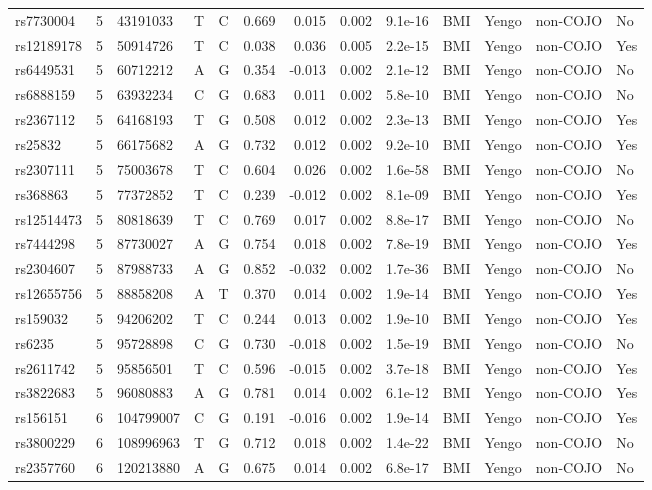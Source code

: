 \documentclass[11pt,twoside]{bristolthesis}
\begin{document}
\begin{longtable}[t]{lrlllrrrlllll}
rs7730004 & 5 & 43191033 & T & C & 0.669 & 0.015 & 0.002 & 9.1e-16 & BMI & Yengo & non-COJO & No\\
rs12189178 & 5 & 50914726 & T & C & 0.038 & 0.036 & 0.005 & 2.2e-15 & BMI & Yengo & non-COJO & Yes\\
rs6449531 & 5 & 60712212 & A & G & 0.354 & -0.013 & 0.002 & 2.1e-12 & BMI & Yengo & non-COJO & No\\
rs6888159 & 5 & 63932234 & C & G & 0.683 & 0.011 & 0.002 & 5.8e-10 & BMI & Yengo & non-COJO & No\\
\addlinespace
rs2367112 & 5 & 64168193 & T & G & 0.508 & 0.012 & 0.002 & 2.3e-13 & BMI & Yengo & non-COJO & Yes\\
rs25832 & 5 & 66175682 & A & G & 0.732 & 0.012 & 0.002 & 9.2e-10 & BMI & Yengo & non-COJO & Yes\\
rs2307111 & 5 & 75003678 & T & C & 0.604 & 0.026 & 0.002 & 1.6e-58 & BMI & Yengo & non-COJO & No\\
rs368863 & 5 & 77372852 & T & C & 0.239 & -0.012 & 0.002 & 8.1e-09 & BMI & Yengo & non-COJO & Yes\\
rs12514473 & 5 & 80818639 & T & C & 0.769 & 0.017 & 0.002 & 8.8e-17 & BMI & Yengo & non-COJO & No\\
\addlinespace
rs7444298 & 5 & 87730027 & A & G & 0.754 & 0.018 & 0.002 & 7.8e-19 & BMI & Yengo & non-COJO & Yes\\
rs2304607 & 5 & 87988733 & A & G & 0.852 & -0.032 & 0.002 & 1.7e-36 & BMI & Yengo & non-COJO & No\\
rs12655756 & 5 & 88858208 & A & T & 0.370 & 0.014 & 0.002 & 1.9e-14 & BMI & Yengo & non-COJO & Yes\\
rs159032 & 5 & 94206202 & T & C & 0.244 & 0.013 & 0.002 & 1.9e-10 & BMI & Yengo & non-COJO & Yes\\
rs6235 & 5 & 95728898 & C & G & 0.730 & -0.018 & 0.002 & 1.5e-19 & BMI & Yengo & non-COJO & No\\
\addlinespace
rs2611742 & 5 & 95856501 & T & C & 0.596 & -0.015 & 0.002 & 3.7e-18 & BMI & Yengo & non-COJO & Yes\\
rs3822683 & 5 & 96080883 & A & G & 0.781 & 0.014 & 0.002 & 6.1e-12 & BMI & Yengo & non-COJO & Yes\\
rs156151 & 6 & 104799007 & C & G & 0.191 & -0.016 & 0.002 & 1.9e-14 & BMI & Yengo & non-COJO & Yes\\
rs3800229 & 6 & 108996963 & T & G & 0.712 & 0.018 & 0.002 & 1.4e-22 & BMI & Yengo & non-COJO & No\\
rs2357760 & 6 & 120213880 & A & G & 0.675 & 0.014 & 0.002 & 6.8e-17 & BMI & Yengo & non-COJO & No\\

\end{longtable}
\end{document}
